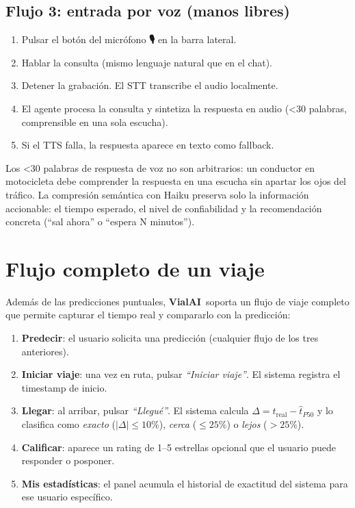 \documentclass[11pt,a4paper]{article}
\newcommand{\VialAI}{\textbf{\textcolor{vialTeal}{Vial}\textcolor{vialAmber}{AI}}}
\begin{document}
\subsection{Flujo 3: entrada por voz (manos libres)}

\begin{enumerate}
\item Pulsar el botón del micrófono \textbf{🎙} en la barra lateral.
\item Hablar la consulta (mismo lenguaje natural que en el chat).
\item Detener la grabación. El STT transcribe el audio localmente.
\item El agente procesa la consulta y sintetiza la respuesta en audio
(\textless 30 palabras, comprensible en una sola escucha).
\item Si el TTS falla, la respuesta aparece en texto como fallback.
\end{enumerate}

\begin{tipbox}
Los \textless 30 palabras de respuesta de voz no son arbitrarios:
un conductor en motocicleta debe comprender la respuesta en una
escucha sin apartar los ojos del tráfico. La compresión semántica
con Haiku preserva solo la información accionable: el tiempo esperado,
el nivel de confiabilidad y la recomendación concreta (``sal ahora''
o ``espera N minutos'').
\end{tipbox}

\section{Flujo completo de un viaje}

Además de las predicciones puntuales, \VialAI\ soporta un flujo de
viaje completo que permite capturar el tiempo real y compararlo con
la predicción:

\begin{enumerate}
\item \textbf{Predecir}: el usuario solicita una predicción (cualquier
flujo de los tres anteriores).
\item \textbf{Iniciar viaje}: una vez en ruta, pulsar
\emph{``Iniciar viaje''}. El sistema registra el timestamp de inicio.
\item \textbf{Llegar}: al arribar, pulsar \emph{``Llegué''}. El sistema
calcula $\Delta = t_\text{real} - \hat{t}_{P50}$ y lo clasifica como
\emph{exacto} ($|\Delta| \leq 10\%$), \emph{cerca} ($\leq 25\%$) o
\emph{lejos} ($> 25\%$).
\item \textbf{Calificar}: aparece un rating de 1--5 estrellas opcional
que el usuario puede responder o posponer.
\item \textbf{Mis estadísticas}: el panel acumula el historial de
exactitud del sistema para ese usuario específico.
\end{enumerate}
\end{document}
